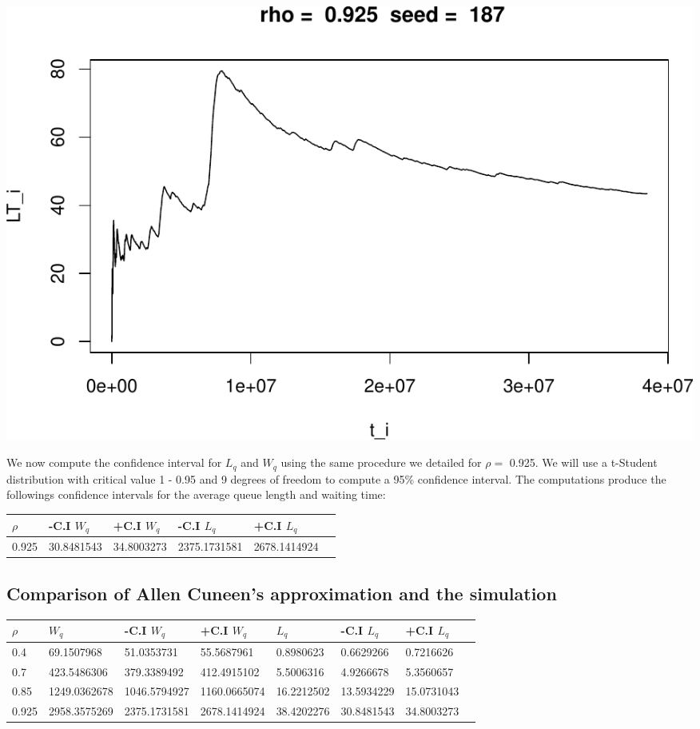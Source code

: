 \documentclass[]{article}
\begin{document}
\includegraphics{003_files/figure-latex/unnamed-chunk-22-10.pdf}

We now compute the confidence interval for \(L_{q}\) and \(W_{q}\) using
the same procedure we detailed for \(\rho =\) 0.925. We will use a
t-Student distribution with critical value 1 - 0.95 and 9 degrees of
freedom to compute a 95\% confidence interval. The computations produce
the followings confidence intervals for the average queue length and
waiting time:

\begin{longtable}[]{@{}llllll@{}}
\toprule
\(\rho\) & -C.I \(W_{q}\) & +C.I \(W_{q}\) & -C.I \(L_{q}\) & +C.I
\(L_{q}\) &\tabularnewline
\midrule
\endhead
0.925 & 30.8481543 & 34.8003273 & 2375.1731581 &
2678.1414924\tabularnewline
\bottomrule
\end{longtable}

\subsection{Comparison of Allen Cuneen's approximation and the
simulation}\label{comparison-of-allen-cuneens-approximation-and-the-simulation}

\begin{longtable}[]{@{}llllllll@{}}
\toprule
\(\rho\) & \(W_{q}\) & -C.I \(W_{q}\) & +C.I \(W_{q}\) & \(L_{q}\) &
-C.I \(L_{q}\) & +C.I \(L_{q}\) &\tabularnewline
\midrule
\endhead
0.4 & 69.1507968 & 51.0353731 & 55.5687961 & 0.8980623 & 0.6629266 &
0.7216626\tabularnewline
0.7 & 423.5486306 & 379.3389492 & 412.4915102 & 5.5006316 & 4.9266678 &
5.3560657\tabularnewline
0.85 & 1249.0362678 & 1046.5794927 & 1160.0665074 & 16.2212502 &
13.5934229 & 15.0731043\tabularnewline
0.925 & 2958.3575269 & 2375.1731581 & 2678.1414924 & 38.4202276 &
30.8481543 & 34.8003273\tabularnewline
\bottomrule
\end{longtable}
\end{document}

